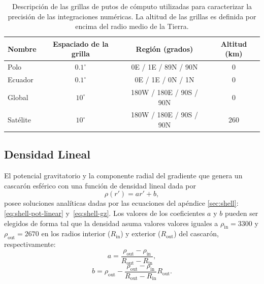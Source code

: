 \begin{table}
\caption{
    Descripción de las grillas de putos de cómputo utilizadas para caracterizar
    la precisión de las integraciones numéricas.
    La altitud de las grillas es definida por encima del radio medio de la
    Tierra.
    \newline
}
\label{tab:grids}
\centering
\begin{tabular}{lccc}
    Nombre & Espaciado de la grilla & Región (grados) & Altitud (km)
    \\ \hline
    Polo      & $0.1^\circ$ &   0E /   1E / 89N / 90N & 0   \\
    Ecuador   & $0.1^\circ$ &   0E /   1E /  0N / 1N  & 0   \\
    Global    & $ 10^\circ$ & 180W / 180E / 90S / 90N & 0   \\
    Satélite  & $ 10^\circ$ & 180W / 180E / 90S / 90N & 260 \\
\end{tabular}
\end{table}


\subsection{Densidad Lineal}

El potencial gravitatorio y la componente radial del gradiente que genera un
cascarón esférico con una función de densidad lineal dada por
%
\begin{equation}
    \rho(r') = ar' + b,
    \label{eq:density-linear}
\end{equation}
%
posee soluciones analíticas dadas por las ecuaciones del apéndice
\ref{sec:shell}: \ref{eq:shell-pot-linear} y~\ref{eq:shell-gz}.
Los valores de los coeficientes $a$ y $b$ pueden ser elegidos de forma tal que
la densidad asuma valores valores iguales a  $\rho_\text{in}
= 3300$\kgpercubicm{} y $\rho_\text{out} = 2670$\kgpercubicm{} en los radios
interior ($R_\text{in}$) y exterior ($R_\text{out}$) del cascarón,
respectivamente:
%
\begin{equation}
    a = \frac{\rho_\text{out} - \rho_\text{in}}{R_\text{out} - R_\text{in}},
\end{equation}
%
\begin{equation}
    b = \rho_\text{out} -
    \frac{
        \rho_\text{out} - \rho_\text{in}
    }{
        R_\text{out} - R_\text{in}
    } R_\text{out}.
\end{equation}


